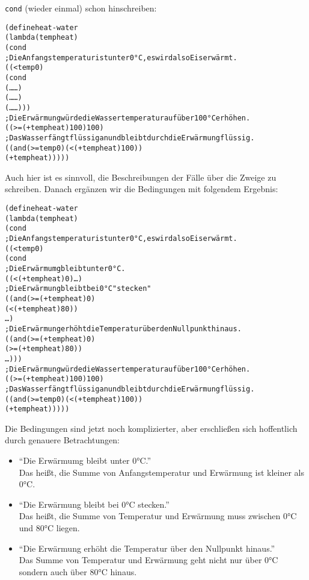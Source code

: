 \texttt{cond} (wieder einmal) schon hinschreiben:
%
\begin{alltt}
(define heat-water
  (lambda (temp heat)
    (cond
      ; Die Anfangstemperatur ist unter 0°C, es wird also Eis erwärmt.
      ((< temp 0)
       (cond
         (\ldots{} \ldots)
         (\ldots{} \ldots)
         (\ldots{} \ldots)))
      ; Die Erwärmung würde die Wassertemperatur auf über 100°C erhöhen.
      ((>= (+ temp heat) 100) 100)
      ; Das Wasser fängt flüssig an und bleibt durch die Erwärmung flüssig.
      ((and (>= temp 0) (< (+ temp heat) 100))
       (+ temp heat)))))
\end{alltt}
%
Auch hier ist es sinnvoll, die Beschreibungen der Fälle über die
Zweige zu schreiben.  Danach ergänzen wir die Bedingungen mit
folgendem Ergebnis:
%
\begin{alltt}
(define heat-water
  (lambda (temp heat)
    (cond
      ; Die Anfangstemperatur ist unter 0°C, es wird also Eis erwärmt.
      ((< temp 0)
       (cond
         ; Die Erwärmumg bleibt unter 0°C.
         ((< (+ temp heat) 0) \ldots)
         ; Die Erwärmung bleibt bei  0°C "stecken"
         ((and (>= (+ temp heat) 0)
               (< (+ temp heat) 80))
          \ldots)
         ; Die Erwärmung erhöht die Temperatur über den Nullpunkt hinaus.
         ((and (>= (+ temp heat) 0)
               (>= (+ temp heat) 80))
          \ldots)))
      ; Die Erwärmung würde die Wassertemperatur auf über 100°C erhöhen.
      ((>= (+ temp heat) 100) 100)
      ; Das Wasser fängt flüssig an und bleibt durch die Erwärmung flüssig.
      ((and (>= temp 0) (< (+ temp heat) 100))
       (+ temp heat)))))
\end{alltt}
%
Die Bedingungen sind jetzt noch komplizierter, aber erschließen sich
hoffentlich durch genauere Betrachtungen:
%
\begin{itemize}
\item "`Die Erwärmumg bleibt unter 0°C."'\\
  Das heißt, die Summe von
  Anfangstemperatur und Erwärmung ist kleiner als 0°C.
\item "`Die Erwärmung bleibt bei  0°C stecken."'\\
  Das heißt, die Summe von Temperatur und Erwärmung muss zwischen 0°C
  und 80°C liegen.
\item "`Die Erwärmung erhöht die Temperatur über den Nullpunkt hinaus."'\\
  Das Summe von Temperatur und Erwärmung geht nicht nur über 0°C
  sondern auch über 80°C hinaus.
\end{itemize}
